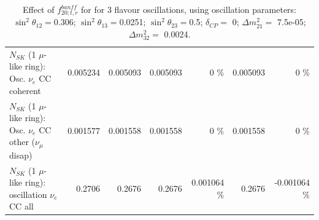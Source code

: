 \begin{table}
\begin{tabular}{| l | r | r | r  r | r  r |}
                          $N_{SK}$ (1 $\mu$-like ring): Osc. $\nu_e$ CC coherent &        0.005234 &        0.005093 &        0.005093 &        0 \%  &        0.005093 &        0 \%  \\ 
           $N_{SK}$ (1 $\mu$-like ring): Osc. $\nu_e$ CC other ($\nu_\mu$ disap) &        0.001577 &        0.001558 &        0.001558 &        0 \%  &        0.001558 &        0 \%  \\ 
                        $N_{SK}$ (1 $\mu$-like ring): oscillation $\nu_e$ CC all &          0.2706 &          0.2676 &          0.2676 & 0.001064 \%  &          0.2676 & -0.001064 \%  \\ 
\hline
\hline
\end{tabular}
\caption{ Effect of $f_{20; t, r}^{banff}$ for for 3 flavour oscillations, using oscillation parameters:  $\sin^2\theta_{12} = $0.306; $\sin^2\theta_{13} = $0.0251; $\sin^2\theta_{23} = $0.5; $\delta_{CP} = $        0; $\Delta m^2_{21} = $    7.5e-05; $\Delta m^2_{32} = $    0.0024. }
\label{tab:num_banff_ccqeE2_1RmuT_3f_osc_t13:0.0251}
\end{table}
\clearpage
